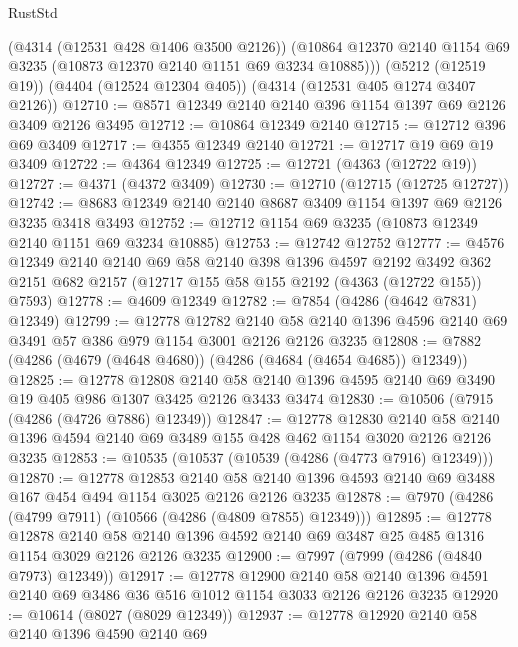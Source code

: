 \begin{lexlean}{RustStd}
\begin{coremodule}
      (@4314 (@12531 @428 @1406 @3500 @2126))
      (@10864 @12370 @2140 @1154 @69 @3235 (@10873 @12370 @2140 @1151 @69 @3234 @10885)))
    (@5212 (@12519 @19))
    (@4404 (@12524 @12304 @405))
    (@4314 (@12531 @405 @1274 @3407 @2126))
@12710 := @8571 @12349 @2140 @2140 @396 @1154 @1397 @69 @2126 @3409 @2126 @3495
@12712 := @10864 @12349 @2140
@12715 := @12712 @396 @69 @3409
@12717 := @4355 @12349 @2140
@12721 := @12717 @19 @69 @19 @3409
@12722 := @4364 @12349
@12725 := @12721 (@4363 (@12722 @19))
@12727 := @4371 (@4372 @3409)
@12730 := @12710 (@12715 (@12725 @12727))
@12742 := @8683 @12349 @2140 @2140 @8687 @3409 @1154 @1397 @69 @2126 @3235 @3418 @3493
@12752 := @12712 @1154 @69 @3235 (@10873 @12349 @2140 @1151 @69 @3234 @10885)
@12753 := @12742 @12752
@12777 := @4576
    @12349
    @2140
    @2140
    @69
    @58
    @2140
    @398
    @1396
    @4597
    @2192
    @3492
    @362
    @2151
    @682
    @2157
    (@12717 @155 @58 @155 @2192 (@4363 (@12722 @155)) @7593)
@12778 := @4609 @12349
@12782 := @7854 (@4286 (@4642 @7831) @12349)
@12799 := @12778
    @12782
    @2140
    @58
    @2140
    @1396
    @4596
    @2140
    @69
    @3491
    @57
    @386
    @979
    @1154
    @3001
    @2126
    @2126
    @3235
@12808 := @7882 (@4286 (@4679 (@4648 @4680)) (@4286 (@4684 (@4654 @4685)) @12349))
@12825 := @12778
    @12808
    @2140
    @58
    @2140
    @1396
    @4595
    @2140
    @69
    @3490
    @19
    @405
    @986
    @1307
    @3425
    @2126
    @3433
    @3474
@12830 := @10506 (@7915 (@4286 (@4726 @7886) @12349))
@12847 := @12778
    @12830
    @2140
    @58
    @2140
    @1396
    @4594
    @2140
    @69
    @3489
    @155
    @428
    @462
    @1154
    @3020
    @2126
    @2126
    @3235
@12853 := @10535 (@10537 (@10539 (@4286 (@4773 @7916) @12349)))
@12870 := @12778
    @12853
    @2140
    @58
    @2140
    @1396
    @4593
    @2140
    @69
    @3488
    @167
    @454
    @494
    @1154
    @3025
    @2126
    @2126
    @3235
@12878 := @7970 (@4286 (@4799 @7911) (@10566 (@4286 (@4809 @7855) @12349)))
@12895 := @12778
    @12878
    @2140
    @58
    @2140
    @1396
    @4592
    @2140
    @69
    @3487
    @25
    @485
    @1316
    @1154
    @3029
    @2126
    @2126
    @3235
@12900 := @7997 (@7999 (@4286 (@4840 @7973) @12349))
@12917 := @12778
    @12900
    @2140
    @58
    @2140
    @1396
    @4591
    @2140
    @69
    @3486
    @36
    @516
    @1012
    @1154
    @3033
    @2126
    @2126
    @3235
@12920 := @10614 (@8027 (@8029 @12349))
@12937 := @12778
    @12920
    @2140
    @58
    @2140
    @1396
    @4590
    @2140
    @69

\end{coremodule}
\end{lexlean}
